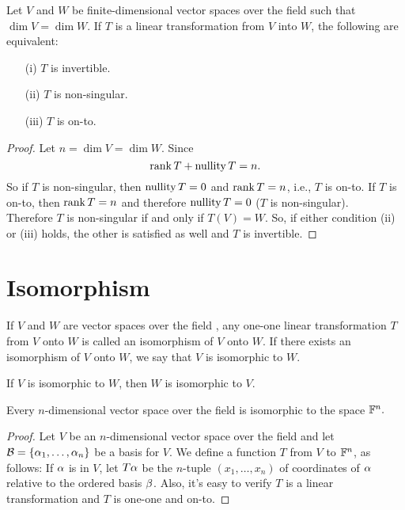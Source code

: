 \documentclass{mynotes}
\begin{document}
\begin{theorem}
Let $V$ and $W$ be finite-dimensional vector spaces over the field \F{} such that $\dim{V}=\dim{W}$. If $T$ is a linear transformation from $V$ into $W$, the following are equivalent:
\begin{itemize}
	\item[(i)]	$T$ is invertible.
	\item[(ii)] $T$ is non-singular.
	\item[(iii)] $T$ is on-to.
\end{itemize}
\end{theorem}
\begin{proof}
Let $n=\dim{V}=\dim{W}.$ Since $$\mathrm{rank}\,{T}+\mathrm{nullity}\,{T} = n.$$So if $T$ is non-singular, then $\mathrm{nullity}\,{T} = 0$ and $\mathrm{rank}\,{T}= n$, i.e., $T$ is on-to.
If $T$ is on-to, then $\mathrm{rank}\,{T} = n$ and therefore $\mathrm{nullity}\,{T} = 0$ ($T$ is non-singular). \\Therefore $T$ is non-singular if and only if $T(V)=W.$ So, if either condition (ii) or (iii) holds, the other is satisfied as well and $T$ is invertible.
\end{proof}
\section{Isomorphism}
\begin{definition}[isomorphism]
If $V$ and $W$ are vector spaces over the field \F, any one-one linear transformation $T$ from $V$ onto $W$ is called an isomorphism of $V$ onto $W$. If there exists an isomorphism of $V$ onto $W$, we say that $V$ is isomorphic to $W$.
\end{definition}
\begin{remark}
If $V$ is isomorphic to $W$, then $W$ is isomorphic to $V$.
\end{remark}
\begin{theorem}
Every $n$-dimensional vector space over the field \F is isomorphic to the space $\mathbb{F}^n.$
\end{theorem}
\begin{proof}
Let $V$ be an $n$-dimensional vector space over the field \F and let $\mathcal{B}=\{\alpha_1,\ldots,\alpha_n\}$ be a basis for $V$. We define a function $T$ from $V$ to $\mathbb{F}^n$, as follows: If $\alpha$ is in $V$, let $T\alpha$ be the $n$-tuple $(x_1,\ldots,x_n)$ of coordinates of $\alpha$ relative to the ordered basis $\mathcal{\beta}$. Also, it's easy to verify $T$ is a linear transformation and $T$ is one-one and on-to.
\end{proof}
\end{document}
